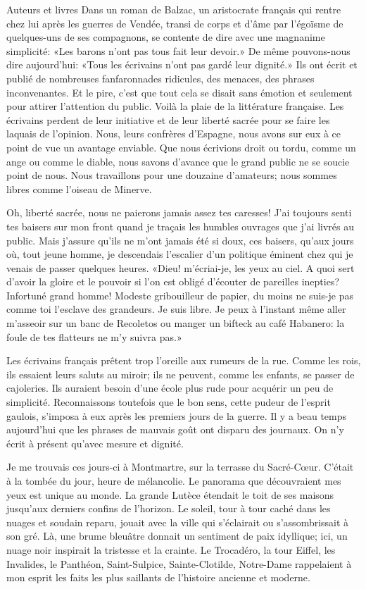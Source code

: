 \begin{chapter}{Auteurs et livres}
Dans un roman de Balzac, un aristocrate français qui rentre chez lui
après les guerres de Vendée, transi de corps et d'âme par l'égoïsme de
quelques-uns de ses compagnons, se contente de dire avec une magnanime
simplicité: «Les barons n'ont pas tous fait leur devoir.» De même
pouvons-nous dire aujourd'hui: «Tous les écrivains n'ont pas gardé leur
dignité.» Ils ont écrit et publié de nombreuses fanfaronnades ridicules,
des menaces, des phrases inconvenantes. Et le pire, c'est que tout cela
se disait sans émotion et seulement pour attirer l'attention du public.
Voilà la plaie de la littérature française. Les écrivains perdent de
leur initiative et de leur liberté sacrée pour se faire les laquais de
l'opinion. Nous, leurs confrères d'Espagne, nous avons sur eux à ce
point de vue un avantage enviable. Que nous écrivions droit ou tordu,
comme un ange ou comme le diable, nous savons d'avance que le grand
public ne se soucie point de nous. Nous travaillons pour une douzaine
d'amateurs; nous sommes libres comme l'oiseau de Minerve.

Oh, liberté sacrée, nous ne paierons jamais assez tes caresses! J'ai
toujours senti tes baisers sur mon front quand je traçais les humbles
ouvrages que j'ai livrés au public. Mais j'assure qu'ils ne m'ont jamais
été si doux, ces baisers, qu'aux jours où, tout jeune homme, je
descendais l'escalier d'un politique éminent chez qui je venais de
passer quelques heures. «Dieu! m'écriai-je, les yeux au ciel. A quoi
sert d'avoir la gloire et le pouvoir si l'on est obligé d'écouter de
pareilles inepties? Infortuné grand homme! Modeste gribouilleur de
papier, du moins ne suis-je pas comme toi l'esclave des grandeurs. Je
suis libre. Je peux à l'instant même aller m'asseoir sur un banc de
Recoletos ou manger un bifteck au café Habanero: la foule de tes
flatteurs ne m'y suivra pas.»

Les écrivains français prêtent trop l'oreille aux rumeurs de la rue.
Comme les rois, ils essaient leurs saluts au miroir; ils ne peuvent,
comme les enfants, se passer de cajoleries. Ils auraient besoin d'une
école plus rude pour acquérir un peu de simplicité. Reconnaissons
toutefois que le bon sens, cette pudeur de l'esprit gaulois, s'imposa à
eux après les premiers jours de la guerre. Il y a beau temps aujourd'hui
que les phrases de mauvais goût ont disparu des journaux. On n'y écrit
à présent qu'avec mesure et dignité.

\horizontalLine

Je me trouvais ces jours-ci à Montmartre, sur la terrasse du
Sacré-Cœur. C'était à la tombée du jour, heure de mélancolie. Le
panorama que découvraient mes yeux est unique au monde. La grande Lutèce
étendait le toit de ses maisons jusqu'aux derniers confins de l'horizon.
Le soleil, tour à tour caché dans les nuages et soudain reparu, jouait
avec la ville qui s'éclairait ou s'assombrissait à son gré. Là, une
brume bleuâtre donnait un sentiment de paix idyllique; ici, un nuage
noir inspirait la tristesse et la crainte. Le Trocadéro, la tour Eiffel,
les Invalides, le Panthéon, Saint-Sulpice, Sainte-Clotilde, Notre-Dame
rappelaient à mon esprit les faits les plus saillants de l'histoire
ancienne et moderne.


\end{chapter}
